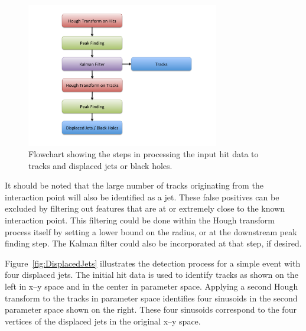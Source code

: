 \documentclass[preprint,sort&compress]{elsarticle}
\begin{document}
\begin{figure}[!Hhtb]
\begin{center}
\includegraphics[width=0.75\textwidth]{Flowchart.pdf} 
\caption{Flowchart showing the steps in processing the input hit data to tracks and displaced jets or black holes.\label{fig:Flowchart}}
\end{center}
\end{figure}

It should be noted that the large number of tracks originating from the interaction point will also be identified as a jet.  These false positives can be excluded by filtering out features that are at or extremely close to the known interaction point.  This filtering could be done within the Hough transform process itself by setting a lower bound on the radius, or at the downstream peak finding step. The Kalman filter could also be incorporated at that step, if desired.

Figure~\ref{fig:DisplacedJets} illustrates the detection process for a simple event with four displaced jets.  The initial hit data is used to identify tracks as shown on the left in x--y space and in the center in parameter space.  Applying a second Hough transform to the tracks in parameter space identifies four sinusoids in the second parameter space shown on the right.  These four sinusoids correspond to the four vertices of the displaced jets in the original x--y space.
\end{document}

